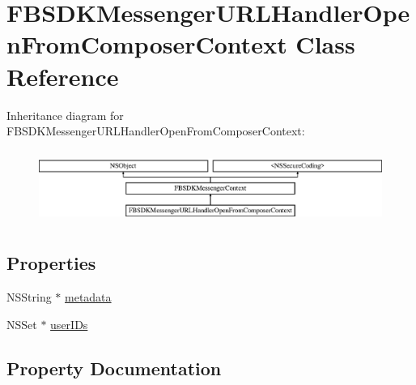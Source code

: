 \hypertarget{interface_f_b_s_d_k_messenger_u_r_l_handler_open_from_composer_context}{}\section{F\+B\+S\+D\+K\+Messenger\+U\+R\+L\+Handler\+Open\+From\+Composer\+Context Class Reference}
\label{interface_f_b_s_d_k_messenger_u_r_l_handler_open_from_composer_context}
Inheritance diagram for F\+B\+S\+D\+K\+Messenger\+U\+R\+L\+Handler\+Open\+From\+Composer\+Context\+:\begin{figure}[H]
\begin{center}
\leavevmode
\includegraphics[height=2.393162cm]{interface_f_b_s_d_k_messenger_u_r_l_handler_open_from_composer_context}
\end{center}
\end{figure}
\subsection*{Properties}
\begin{DoxyCompactItemize}
\item 
N\+S\+String $\ast$ \hyperlink{interface_f_b_s_d_k_messenger_u_r_l_handler_open_from_composer_context_ae506afbcd01aff6b1ba765aa865307e2}{metadata}
\item 
N\+S\+Set $\ast$ \hyperlink{interface_f_b_s_d_k_messenger_u_r_l_handler_open_from_composer_context_aec97bc39429cab5358c3020ad5edd125}{user\+I\+Ds}
\end{DoxyCompactItemize}


\subsection{Property Documentation}
\hypertarget{interface_f_b_s_d_k_messenger_u_r_l_handler_open_from_composer_context_ae506afbcd01aff6b1ba765aa865307e2}{}
